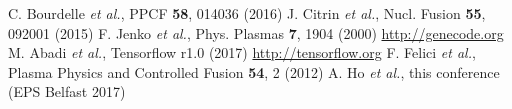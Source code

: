 \documentclass{epsconf}
\begin{document}
\newcommand{\etal}{\textit{et al.}}
\begin{thebibliography}{99}
C. Bourdelle \etal, PPCF {\bf 58}, 014036 (2016)
J. Citrin \etal, Nucl. Fusion {\bf 55}, 092001 (2015)
F. Jenko \etal, Phys. Plasmas {\bf 7}, 1904 (2000) \url{http://genecode.org}
M. Abadi \etal, {Tensorflow r1.0} (2017) \url{http://tensorflow.org}
F. Felici \etal, Plasma Physics and Controlled Fusion {\bf 54}, 2 (2012)
A. Ho \etal, this conference (EPS Belfast 2017)

\end{thebibliography}
\end{document}
